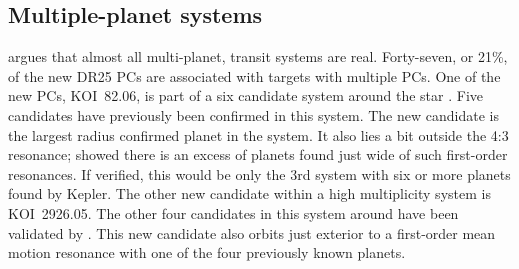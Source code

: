\subsection{Multiple-planet systems}
\citet{Lissauer2014} argues that almost all multi-planet, transit systems are real. Forty-seven, or 21\%, of the new DR25 PCs are associated with targets with multiple PCs. One of the new PCs, KOI~82.06, is part of a six candidate system around the star . Five candidates have previously been confirmed \citep{Marcy2014,Rowe2014} in this system. The new candidate is the largest radius confirmed planet in the system. It also lies a bit outside the 4:3 resonance; \citet{Lissauer2011} showed there is an excess of planets found just wide of such first-order resonances. If verified, this would be only the 3rd system with six or more planets found by Kepler. 
The other new candidate within a high multiplicity system is KOI~2926.05. The other four candidates in this system around  have been validated by \citet{Morton2016}. This new candidate also orbits just exterior to a first-order mean motion resonance with one of the four previously known planets.


